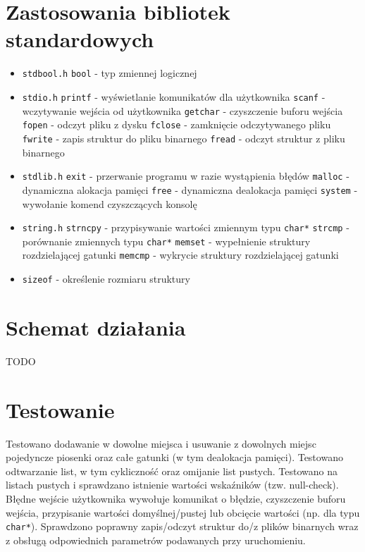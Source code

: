 \documentclass[a4paper, 12pt]{article}
\begin{document}
\section*{Zastosowania bibliotek standardowych}
\begin{itemize}
    \item \texttt{stdbool.h}
        \subitem \texttt{bool} - typ zmiennej logicznej
    \item \texttt{stdio.h}
        \subitem \texttt{printf} - wyświetlanie komunikatów dla użytkownika
        \subitem \texttt{scanf} - wczytywanie wejścia od użytkownika
        \subitem \texttt{getchar} - czyszczenie buforu wejścia
        \subitem \texttt{fopen} - odczyt pliku z dysku
        \subitem \texttt{fclose} - zamknięcie odczytywanego pliku
        \subitem \texttt{fwrite} - zapis struktur do pliku binarnego
        \subitem \texttt{fread} - odczyt struktur z pliku binarnego
    \item \texttt{stdlib.h}
        \subitem \texttt{exit} - przerwanie programu w razie wystąpienia błędów
        \subitem \texttt{malloc} - dynamiczna alokacja pamięci
        \subitem \texttt{free} - dynamiczna dealokacja pamięci
        \subitem \texttt{system} - wywołanie komend czyszczących konsolę
    \item \texttt{string.h}
        \subitem \texttt{strncpy} - przypisywanie wartości zmiennym typu \texttt{char*}
        \subitem \texttt{strcmp} - porównanie zmiennych typu \texttt{char*}
        \subitem \texttt{memset} - wypełnienie struktury rozdzielającej gatunki
        \subitem \texttt{memcmp} - wykrycie struktury rozdzielającej gatunki
    \item \texttt{sizeof} - określenie rozmiaru struktury
\end{itemize}

\section*{Schemat działania}
TODO

\section*{Testowanie}
Testowano dodawanie w dowolne miejsca i usuwanie z dowolnych miejsc pojedyncze piosenki oraz całe gatunki (w tym dealokacja pamięci). Testowano odtwarzanie list, w tym cykliczność oraz omijanie list pustych. Testowano na listach pustych i sprawdzano istnienie wartości wskaźników (tzw. null-check). Błędne wejście użytkownika wywołuje komunikat o błędzie, czyszczenie buforu wejścia, przypisanie wartości domyślnej/pustej lub obcięcie wartości (np. dla typu \texttt{char*}). Sprawdzono poprawny zapis/odczyt struktur do/z plików binarnych wraz z obsługą odpowiednich parametrów podawanych przy uruchomieniu.
\end{document}
